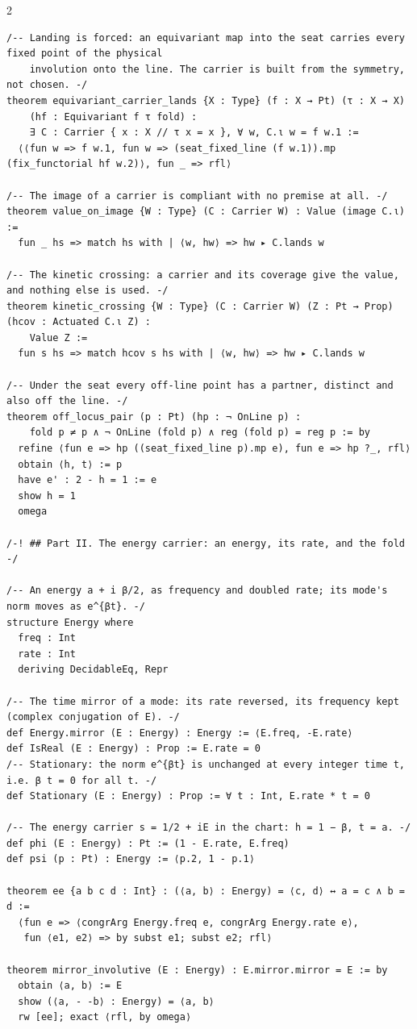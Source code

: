 \documentclass[10pt]{article}
\begin{document}
\begin{multicols}{2}
\begin{Verbatim}[fontsize=\fontsize{5.9}{6.8}\selectfont,breaklines,breakanywhere,breaksymbolleft={}]
/-- Landing is forced: an equivariant map into the seat carries every fixed point of the physical
    involution onto the line. The carrier is built from the symmetry, not chosen. -/
theorem equivariant_carrier_lands {X : Type} (f : X → Pt) (τ : X → X)
    (hf : Equivariant f τ fold) :
    ∃ C : Carrier { x : X // τ x = x }, ∀ w, C.ι w = f w.1 :=
  ⟨⟨fun w => f w.1, fun w => (seat_fixed_line (f w.1)).mp (fix_functorial hf w.2)⟩, fun _ => rfl⟩

/-- The image of a carrier is compliant with no premise at all. -/
theorem value_on_image {W : Type} (C : Carrier W) : Value (image C.ι) :=
  fun _ hs => match hs with | ⟨w, hw⟩ => hw ▸ C.lands w

/-- The kinetic crossing: a carrier and its coverage give the value, and nothing else is used. -/
theorem kinetic_crossing {W : Type} (C : Carrier W) (Z : Pt → Prop) (hcov : Actuated C.ι Z) :
    Value Z :=
  fun s hs => match hcov s hs with | ⟨w, hw⟩ => hw ▸ C.lands w

/-- Under the seat every off-line point has a partner, distinct and also off the line. -/
theorem off_locus_pair (p : Pt) (hp : ¬ OnLine p) :
    fold p ≠ p ∧ ¬ OnLine (fold p) ∧ reg (fold p) = reg p := by
  refine ⟨fun e => hp ((seat_fixed_line p).mp e), fun e => hp ?_, rfl⟩
  obtain ⟨h, t⟩ := p
  have e' : 2 - h = 1 := e
  show h = 1
  omega

/-! ## Part II. The energy carrier: an energy, its rate, and the fold -/

/-- An energy a + i β/2, as frequency and doubled rate; its mode's norm moves as e^{βt}. -/
structure Energy where
  freq : Int
  rate : Int
  deriving DecidableEq, Repr

/-- The time mirror of a mode: its rate reversed, its frequency kept (complex conjugation of E). -/
def Energy.mirror (E : Energy) : Energy := ⟨E.freq, -E.rate⟩
def IsReal (E : Energy) : Prop := E.rate = 0
/-- Stationary: the norm e^{βt} is unchanged at every integer time t, i.e. β t = 0 for all t. -/
def Stationary (E : Energy) : Prop := ∀ t : Int, E.rate * t = 0

/-- The energy carrier s = 1/2 + iE in the chart: h = 1 − β, t = a. -/
def phi (E : Energy) : Pt := (1 - E.rate, E.freq)
def psi (p : Pt) : Energy := ⟨p.2, 1 - p.1⟩

theorem ee {a b c d : Int} : (⟨a, b⟩ : Energy) = ⟨c, d⟩ ↔ a = c ∧ b = d :=
  ⟨fun e => ⟨congrArg Energy.freq e, congrArg Energy.rate e⟩,
   fun ⟨e1, e2⟩ => by subst e1; subst e2; rfl⟩

theorem mirror_involutive (E : Energy) : E.mirror.mirror = E := by
  obtain ⟨a, b⟩ := E
  show (⟨a, - -b⟩ : Energy) = ⟨a, b⟩
  rw [ee]; exact ⟨rfl, by omega⟩


\end{Verbatim}
\end{multicols}
\end{document}
